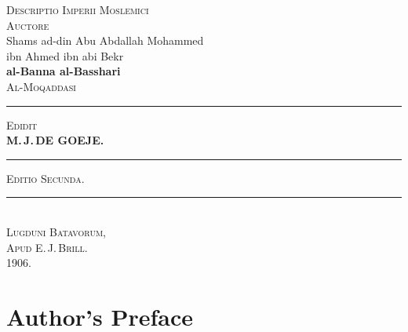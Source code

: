 \documentclass[11pt,a4paper]{article}
\newcommand{\shortline}{\noindent\rule{0.5\textwidth}{0.4pt}\par}
\begin{document}
\thispagestyle{empty}
\begin{center}
\vspace*{2cm}

{\Huge\textsc{Descriptio Imperii Moslemici}}\\[2cm]

{\large\textsc{Auctore}}\\[1cm]

{\Large Shams ad-din Abu Abdallah Mohammed}\\
{\Large ibn Ahmed ibn abi Bekr}\\[0.3cm]
{\Large\textbf{al-Banna al-Basshari}}\\[1cm]

{\LARGE\textsc{Al-Moqaddasi}}\\[2cm]

\shortline
\vspace{0.5cm}

{\large\textsc{Edidit}}\\[0.5cm]

{\LARGE\textbf{M.\,J.\,DE GOEJE.}}\\[1.5cm]

\shortline
\vspace{1cm}

{\large\textsc{Editio Secunda.}}\\[2cm]

\vfill

\rule{0.3\textwidth}{0.6pt}\\[0.5cm]

{\large\textsc{Lugduni Batavorum,}}\\
{\large\textsc{Apud E.\,J.\,Brill.}}\\
{\large\textsc{1906.}}\\

\end{center}
\clearpage

\setcounter{page}{1}

\section*{Author's Preface}
\end{document}
